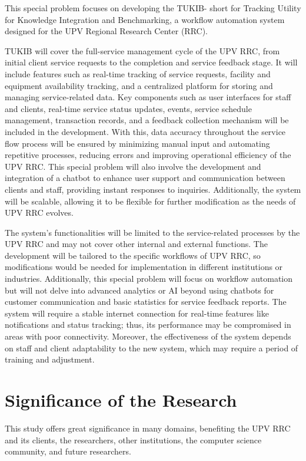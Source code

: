 This special problem focuses on developing the TUKIB- short for Tracking Utility for Knowledge Integration and Benchmarking, a workflow automation system designed for the UPV Regional Research Center (RRC). 

TUKIB will cover the full-service management cycle of the UPV RRC, from initial client service requests to the completion and service feedback stage. It will include features such as real-time tracking of service requests, facility and equipment availability tracking, and a centralized platform for storing and managing service-related data. Key components such as user interfaces for staff and clients, real-time service status updates, events, service schedule management, transaction records, and a feedback collection mechanism will be included in the development. With this, data accuracy throughout the service flow process will be ensured by minimizing manual input and automating repetitive processes, reducing errors and improving operational efficiency of the UPV RRC. This special problem will also involve the development and integration of a chatbot to enhance user support and communication between clients and staff, providing instant responses to inquiries. Additionally, the system will be scalable, allowing it to be flexible for further modification as the needs of UPV RRC evolves.

The system’s functionalities will be limited to the service-related processes by the UPV RRC and may not cover other internal and external functions. The development will be tailored to the specific workflows of UPV RRC, so modifications would be needed for implementation in different institutions or industries. Additionally, this special problem will focus on workflow automation but will not delve into advanced analytics or AI beyond using chatbots for customer communication and basic statistics for service feedback reports. The system will require a stable internet connection for real-time features like notifications and status tracking; thus, its performance may be compromised in areas with poor connectivity. Moreover, the effectiveness of the system depends on staff and client adaptability to the new system, which may require a period of training and adjustment.


\section{Significance of the Research}
\label{sec:significance}

This study offers great significance in many domains, benefiting the UPV RRC and its clients, the researchers, other institutions, the computer science community, and future researchers.

